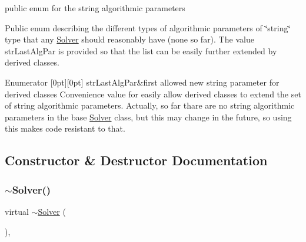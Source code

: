 public enum for the string algorithmic parameters 

Public enum describing the different types of algorithmic parameters of \char`\"{}string\char`\"{} type that any \mbox{\hyperlink{class_s_m_spp__di__unipi__it_1_1_solver}{Solver}} should reasonably have (none so far). The value str\+Last\+Alg\+Par is provided so that the list can be easily further extended by derived classes. \begin{DoxyEnumFields}{Enumerator}
[0pt][0pt]{}\mbox{\label{class_s_m_spp__di__unipi__it_1_1_solver_a350eaed52c8a495f2505e5556affaa04a70a754568a017cce62e259e96b54852b}} 
str\+Last\+Alg\+Par&first allowed new string parameter for derived classes Convenience value for easily allow derived classes to extend the set of string algorithmic parameters. Actually, so far thare are no string algorithmic parameters in the base \mbox{\hyperlink{class_s_m_spp__di__unipi__it_1_1_solver}{Solver}} class, but this may change in the future, so using this makes code resistant to that. \\
\hline

\end{DoxyEnumFields}


\subsection{Constructor \& Destructor Documentation}
\mbox{\label{class_s_m_spp__di__unipi__it_1_1_solver_ab9c9ebc43a9ddc2636898389c2523ba0}} 
\subsubsection{\texorpdfstring{$\sim$\+Solver()}{~Solver()}}
{\footnotesize\ttfamily virtual $\sim$\mbox{\hyperlink{class_s_m_spp__di__unipi__it_1_1_solver}{Solver}} (\begin{DoxyParamCaption}{ }\end{DoxyParamCaption})\hspace{0.3cm}{\ttfamily [inline]}, {\ttfamily [virtual]}}



